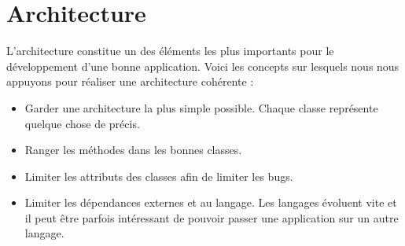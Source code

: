 \chapter{Architecture}
\minitoc

L'architecture constitue un des éléments les plus importants pour le développement d'une bonne application.
Voici les concepts sur lesquels nous nous appuyons pour réaliser une architecture cohérente :  

\begin{itemize}
  \item Garder une architecture la plus simple possible. Chaque classe représente quelque chose de précis.
  \item Ranger les méthodes dans les bonnes classes.
  \item Limiter les attributs des classes afin de limiter les bugs.
  \item Limiter les dépendances externes et au langage. Les langages évoluent vite et il peut être parfois intéressant de pouvoir passer une application sur un autre langage.
\end{itemize}




